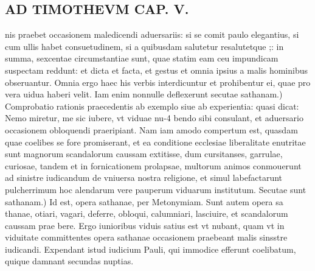 \documentclass{article}
\begin{document}
\begin{pages}
\section*{AD TIMOTHEVM CAP. V. }
\marginpar{[ p.112 ]}\pstart nis praebet occasionem maledicendi aduersariis: si se comit paulo elegantius, si cum ullis habet consuetudinem, si a quibusdam salutetur resalutetque ;: in summa, sexcentae circumstantiae sunt, quae statim eam ceu impundicam suspectam reddunt: et dicta et facta, et gestus et omnia ipsius a malis hominibus obseruantur. Omnia ergo haec his verbis interdicuntur et prohibentur ei, quae pro vera uidua haberi velit.  \pend\pstart Iam enim nonnulle deflexerunt secutae sathanam.) Comprobatio rationis praecedentis ab exemplo siue ab experientia: quasi dicat: Nemo miretur, me sic iubere, vt viduae nu-4 bendo sibi consulant, et aduersario occasionem obloquendi praeripiant. Nam iam amodo compertum est, quasdam quae coelibes se fore promiserant, et ea conditione ecclesiae liberalitate enutritae sunt magnorum scandalorum caussam extitisse, dum cursitanses, garrulae, curiosae, tandem et in fornicationem prolapsae, multorum animos conmouerunt ad sinistre iudicandum de vniuersa nostra religione, et simul labefactarunt pulcherrimum hoc alendarum vere pauperum viduarum institutum.  \pend\pstart Secutae sunt sathanam.) Id est, opera sathanae, per Metonymiam. Sunt autem opera sa thanae, otiari, vagari, deferre, obloqui, calumniari, lasciuire, et scandalorum caussam prae bere. Ergo iunioribus viduis satius est vt nubant, quam vt in viduitate committentes opera sathanae occasionem praebeant malis sinsstre iudicandi. Expendant istud iudicium Pauli, qui immodice efferunt coelibatum, quique damnant secundas nuptias.  \pend
{}
{}

\end{pages}
\end{document}
